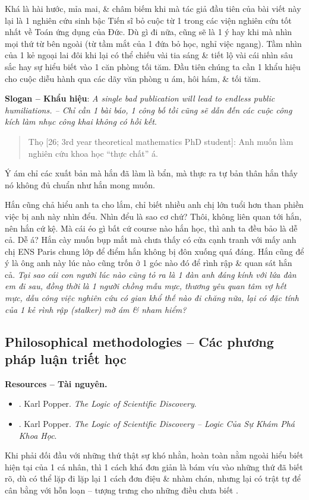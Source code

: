 \documentclass[12pt]{article}
\begin{document}
Khá là hài hước, mỉa mai, \& châm biếm khi mà tác giả đầu tiên của bài viết này lại là 1 nghiên cứu sinh bậc Tiến sĩ bỏ cuộc từ 1 trong các viện nghiên cứu tốt nhất về Toán ứng dụng của Đức. Dù gì đi nữa, cũng sẽ là 1 ý hay khi mà nhìn mọi thứ từ bên ngoài (từ tầm mắt của 1 đứa bỏ học, nghỉ việc ngang). Tầm nhìn của 1 kẻ ngoại lai đôi khi lại có thể chiếu vài tia sáng \& tiết lộ vài cái nhìn sâu sắc hay sự hiểu biết vào 1 căn phòng tối tăm. Đầu tiên chúng ta cần 1 khẩu hiệu cho cuộc diễu hành qua các dãy văn phòng u ám, hôi hám, \& tối tăm.

\vspace{2mm}
\noindent\textsf{\textbf{Slogan -- Khẩu hiệu}}: {\it A single bad publication will lead to endless public humiliations. -- Chỉ cần 1 bài báo, 1 công bố tồi cũng sẽ dẫn đến các cuộc công kích làm nhục công khai không có hồi kết}.

\begin{quotation}
	{\sf Thọ [26; 3rd year theoretical mathematics PhD student]}: Anh muốn làm nghiên cứu khoa học ``thực chất'' á.
\end{quotation}
Ý ám chỉ các xuất bản mà hắn đã làm là bẩn, mà thực ra tự bản thân hắn thấy nó không đủ chuẩn như hắn mong muốn.

Hắn cũng chả hiểu anh ta cho lắm, chỉ biết nhiều anh chị lớn tuổi hơn than phiền việc bị anh này nhìn đểu. Nhìn đểu là sao cơ chứ? Thôi, không liên quan tới hắn, nên hắn cứ kệ. Mà cái éo gì bất cứ course nào hắn học, thì anh ta đều bảo là dễ cả. Dễ á? Hắn cày muốn bụp mắt mà chưa thấy có cửa cạnh tranh với mấy anh chị ENS Paris chung lớp để điểm hắn không bị đôn xuống quá đáng. Hắn cũng để ý là ông anh này lúc nào cũng trốn ở 1 góc nào đó để rình rập \& quan sát hắn cả. {\it Tại sao cái con người lúc nào cũng tỏ ra là 1 đàn anh đáng kính với lứa đàn em đi sau, đồng thời là 1 người chồng mẫu mực, thương yêu quan tâm vợ hết mực, dẫu công việc nghiên cứu có gian khổ thế nào đi chăng nữa, lại có đặc tính của 1 kẻ rình rập (stalker) mờ ám \& nham hiểm?}

\subsection{Philosophical methodologies -- Các phương pháp luận triết học}
\textbf{\textsf{Resources -- Tài nguyên.}}
\begin{itemize}
	\item \cite{Popper_logic_science}. {\sc Karl Popper}. {\it The Logic of Scientific Discovery}.
	\item \cite{Popper_logic_khoa_hoc}. {\sc Karl Popper}. {\it The Logic of Scientific Discovery -- Logic Của Sự Khám Phá Khoa Học}.
\end{itemize}
Khi phải đối đầu với những thứ thật sự khó nhằn, hoàn toàn nằm ngoài hiểu biết hiện tại của 1 cá nhân, thì 1 cách khá đơn giản là bám víu vào những thứ đã biết rõ, dù có thể lặp đi lặp lại 1 cách đơn điệu \& nhàm chán, nhưng lại có trật tự để cân bằng với hỗn loạn -- tượng trưng cho những điều chưa biết \cite{Peterson2018,Peterson2022a,Peterson2022b}.
\end{document}
